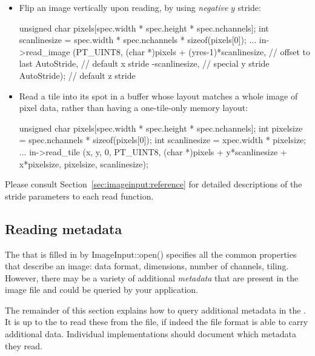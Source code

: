\begin{itemize}
\item Flip an image vertically upon reading, by using \emph{negative}
  $y$ stride:
  \begin{code}
        unsigned char pixels[spec.width * spec.height * spec.nchannels];
        int scanlinesize = spec.width * spec.nchannels * sizeof(pixels[0]);
        ...
        in->read_image (PT_UINT8,
                        (char *)pixels + (yres-1)*scanlinesize,  // offset to last
                        AutoStride,                      // default x stride
                        -scanlinesize,                   // special y stride
                        AutoStride);                     // default z stride
  \end{code}
\item Read a tile into its spot in a buffer whose layout matches
  a whole image of pixel data,
  rather than having a one-tile-only memory layout:
  \begin{code}
        unsigned char pixels[spec.width * spec.height * spec.nchannels];
        int pixelsize = spec.nchannels * sizeof(pixels[0]);
        int scanlinesize = xpec.width * pixelsize;
        ...
        in->read_tile (x, y, 0, PT_UINT8,
                       (char *)pixels + y*scanlinesize + x*pixelsize,
                       pixelsize,
                       scanlinesize);
  \end{code}
\end{itemize}

Please consult Section~\ref{sec:imageinput:reference} for detailed
descriptions of the stride parameters to each {\cf read} function.


\subsection{Reading metadata}
\label{sec:imageinput:metadata}

The \ImageSpec that is filled in by {\cf ImageInput::open()}
specifies all the common properties that describe an image: data format,
dimensions, number of channels, tiling.  However, there may be a variety
of additional \emph{metadata} that are present in the image file and
could be queried by your application.

The remainder of this section explains how to query additional metadata
in the \ImageSpec.  It is up to the \ImageInput to read these
from the file, if indeed the file format is able to carry additional
data.  Individual \ImageInput implementations should document which
metadata they read.

